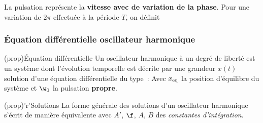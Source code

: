 \documentclass[../../main/main.tex]{subfiles}
\begin{document}
\begin{tcbraster}[raster columns=2, raster equal height=rows]
\begin{tcb}[label=exem:graph]
\begin{center}
{			}
		\end{center}
		La pulsation représente la \textbf{vitesse avec de variation de la phase}.
		Pour une variation de $2\pi$ effectuée à la période $T$, on définit
		\psw{
			\[
				\boxed{\w = 2 \frac{\pi}{T} = 2\pi f}
				\Lra
				\boxed{T = \frac{2\pi}{\w}}
			\]
		}
		\vspace{-15pt}
	\end{tcb}
\end{tcbraster}

\subsubsection{Équation différentielle oscillateur harmonique}

\begin{tcbraster}[raster columns=2, raster equal height=rows]
	\begin{tcb}[label=prop:eqdiffoh](prop){Équation différentielle}
		Un oscillateur harmonique à un degré de liberté est un système dont
		l'évolution temporelle est décrite par une grandeur $x(t)$ solution
		d'une équation différentielle du type~:
		\psw{
		\[
			\boxed{ \dv[2]{x}{t} + \w_0{}^2x = \w_0{}^2x_{\rm eq}}
		\]
		}
		Avec $x_{\rm eq}$ la position d'équilibre du système et $\w_0$ la
		pulsation \textbf{propre}.
	\end{tcb}
	\begin{tcb}[label=prop:soluoh](prop)'r'{Solutions}
		La forme générale des solutions d'un oscillateur harmonique s'écrit de
		manière équivalente
		avec $A'$, $\f$, $A$, $B$ des \textit{constantes d'intégration}.
	\end{tcb}
\end{tcbraster}
\end{document}
